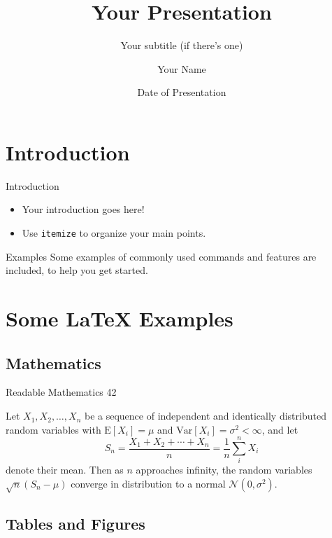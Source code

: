 \documentclass[10pt,xcolor={table,dvipsnames},t]{beamer}
\title[Your Short Title]{Your Presentation}
\subtitle{Your subtitle (if there's one)}
\author{Your Name}
\institute{Your Faculty/Department}
\date{Date of Presentation}
\begin{document}
\begin{frame}
  \titlepage
\end{frame}


\section{Introduction}

\begin{frame}{Introduction}

\begin{itemize}
  \item Your introduction goes here!
  \item Use \texttt{itemize} to organize your main points.
\end{itemize}

\begin{block}{Examples}
Some examples of commonly used commands and features are included, to help you get started.
\end{block}

\end{frame}

\section{Some \LaTeX{} Examples}

\subsection{Mathematics}

\begin{frame}{Readable Mathematics 42}

Let $X_1, X_2, \ldots, X_n$ be a sequence of independent and identically distributed random variables with $\text{E}[X_i] = \mu$ and $\text{Var}[X_i] = \sigma^2 < \infty$, and let
$$S_n = \frac{X_1 + X_2 + \cdots + X_n}{n}
      = \frac{1}{n}\sum_{i}^{n} X_i$$
denote their mean. Then as $n$ approaches infinity, the random variables $\sqrt{n}(S_n - \mu)$ converge in distribution to a normal $\mathcal{N}(0, \sigma^2)$.

\end{frame}


\subsection{Tables and Figures}
\end{document}
